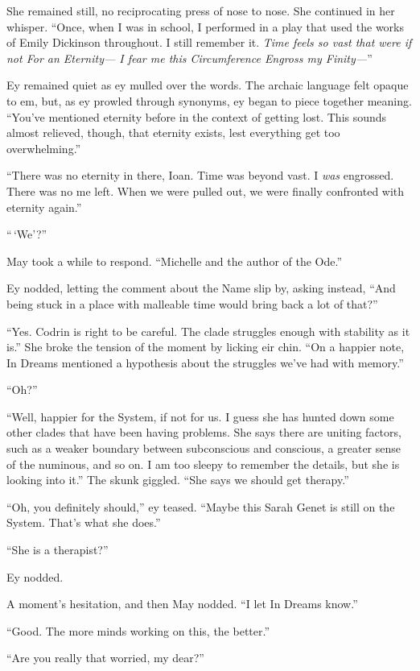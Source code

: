 She remained still, no reciprocating press of nose to nose. She continued in her whisper. ``Once, when I was in school, I performed in a play that used the works of Emily Dickinson throughout. I still remember it. \emph{Time feels so vast that were if not For an Eternity— I fear me this Circumference Engross my Finity—}''

Ey remained quiet as ey mulled over the words. The archaic language felt opaque to em, but, as ey prowled through synonyms, ey began to piece together meaning. ``You've mentioned eternity before in the context of getting lost. This sounds almost relieved, though, that eternity exists, lest everything get too overwhelming.''

``There was no eternity in there, Ioan. Time was beyond vast. I \emph{was} engrossed. There was no me left. When we were pulled out, we were finally confronted with eternity again.''

``\,`We'?''

May took a while to respond. ``Michelle and the author of the Ode.''

Ey nodded, letting the comment about the Name slip by, asking instead, ``And being stuck in a place with malleable time would bring back a lot of that?''

``Yes. Codrin is right to be careful. The clade struggles enough with stability as it is.'' She broke the tension of the moment by licking eir chin. ``On a happier note, In Dreams mentioned a hypothesis about the struggles we've had with memory.''

``Oh?''

``Well, happier for the System, if not for us. I guess she has hunted down some other clades that have been having problems. She says there are uniting factors, such as a weaker boundary between subconscious and conscious, a greater sense of the numinous, and so on. I am too sleepy to remember the details, but she is looking into it.'' The skunk giggled. ``She says we should get therapy.''

``Oh, you definitely should,'' ey teased. ``Maybe this Sarah Genet is still on the System. That's what she does.''

``She is a therapist?''

Ey nodded.

A moment's hesitation, and then May nodded. ``I let In Dreams know.''

``Good. The more minds working on this, the better.''

``Are you really that worried, my dear?''

